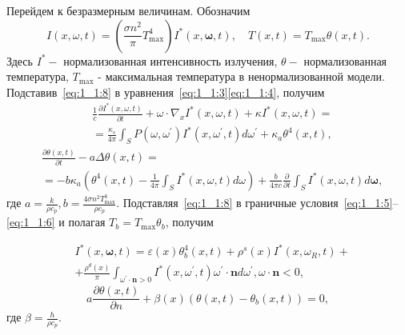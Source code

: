 Перейдем к безразмерным величинам.
Обозначим
\begin{equation}
    \label{eq:1_1:8}
    I(x, \omega, t)=\left(\frac{\sigma n^{2}}{\pi}
    T_{\max }^{4}\right) I^{*}(x, \boldsymbol{\omega}, t),
    \quad T(x, t)=T_{\max } \theta(x, t).
\end{equation}
Здесь $I^{*}-$ нормализованная интенсивность излучения,
$\theta-$ нормализованная температура, $T_{\max }$ - максимальная температура
в ненормализованной модели.
Подставив~\eqref{eq:1_1:8} в уравнения~\eqref{eq:1_1:3}\eqref{eq:1_1:4}, получим
\begin{equation}
    \label{eq:1_1:9}
    \begin{aligned}
        &\frac{1}{c} \frac{\partial I^{*}(x, \omega, t)}{\partial t}
        +\omega \cdot \nabla_{x} I^{*}(x, \omega, t) +\kappa I^{*}(x, \omega, t)=\\
        &= \frac{\kappa_{s}}{4 \pi} \int_{S} P\left(\omega, \omega^{\prime}\right) I^{*}
        \left(x, \omega^{\prime}, t\right) d \omega^{\prime}+\kappa_{a} \theta^{4}(x, t),
    \end{aligned}
\end{equation}
\begin{equation}
    \label{eq:1_1:10}
    \begin{aligned}
        & \frac{\partial \theta(x, t)}{\partial t}
        - a \Delta \theta(x, t) = \\
        & = - b \kappa_{a}\left(\theta^{4}(x, t)-\frac{1}{4 \pi}
        \int_{S} I^{*}(x, \omega, t) d \omega\right)
        + \frac{b}{4 \pi c} \frac{\partial}{\partial t}
        \int_{S} I^{*}(x, \omega, t) d \boldsymbol{\omega},
    \end{aligned}
\end{equation}
где $a=\frac{k}{\rho c_{p}}, b=\frac{4 \sigma n^{2} T_{\max }^{3}}{\rho c_{p}}$.
Подставляя~\eqref{eq:1_1:8} в граничные условия~\eqref{eq:1_1:5}--\eqref{eq:1_1:6}
и полагая $T_{b}=T_{\max } \theta_{b}$, получим

\begin{equation}
    \label{eq:1_1:11}
    \begin{aligned}
        & I^{*}(x, \boldsymbol{\omega}, t) =
        \varepsilon(x) \theta_{b}^{4}(x, t)
        +\rho^{s}(x) I^{*}\left(x, \omega_{R}, t\right)+ \\
        & +\frac{\rho^{d}(x)}{\pi} \int_{\omega^{\prime} \cdot \mathbf{n}>0} I^{*}
        \left(x, \omega^{\prime}, t\right) \omega^{\prime}
        \cdot \mathbf{n} d \omega^{\prime}, \omega \cdot \mathbf{n}<0,
    \end{aligned}
\end{equation}
\begin{equation}
    \label{eq:1_1:12}
    a \frac{\partial \theta(x, t)}{\partial n}+\beta(x)\left(\theta(x, t)
    -\theta_{b}(x, t)\right)=0,
\end{equation}
где $\beta=\frac{h}{\rho c_{p}}$.


